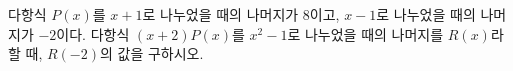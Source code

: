 다항식 $P(x)$를 $x+1$로 나누었을 때의 나머지가 $8$이고, $x-1$로 나누었을 때의 나머지가 $-2$이다. 다항식 $(x+2)P(x)$를 $x^2-1$로 나누었을 때의 나머지를 $R(x)$라 할 때, $R(-2)$의 값을 구하시오.
